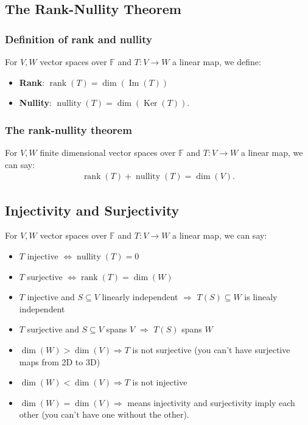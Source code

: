 \documentclass[a4paper, 12pt, twoside]{article}
\DeclareMathOperator{\Ker}{Ker}
\DeclareMathOperator{\Ima}{Im}
\DeclareMathOperator{\Rank}{rank}
\DeclareMathOperator{\Null}{nullity}
\begin{document}
\subsection{The Rank-Nullity Theorem}

\subsubsection{Definition of rank and nullity}

For $V, W$ vector spaces over $\mathbb{F}$ and $T : V \to W$ a 
linear map, we define:
\begin{itemize}
  \item \textbf{Rank}: $\Rank(T) = \dim(\Ima(T))$
  \item \textbf{Nullity}: $\Null(T) = \dim(\Ker(T))$.
\end{itemize}

\subsubsection{The rank-nullity theorem}

For $V, W$ finite dimensional vector spaces over $\mathbb{F}$ 
and $T : V \to W$ a linear map, we can say:
\begin{align*}
  \Rank(T) + \Null(T) = \dim(V).
\end{align*}

\subsection{Injectivity and Surjectivity}

For $V, W$ vector spaces over $\mathbb{F}$ and $T : V \to W$ a 
linear map, we can say:
\begin{itemize}
  \item $T$ injective $\Leftrightarrow \Null(T) = 0$
  \item $T$ surjective $\Leftrightarrow \Rank(T) = \dim(W)$
  \item $T$ injective and $S \subseteq V$ linearly independent
  $\Rightarrow$ $T(S) \subseteq W$ is linealy independent
  \item $T$ surjective and $S \subseteq V$ spans $V$ 
  $\Rightarrow$ $T(S)$ spans $W$
  \item $\dim(W) > \dim(V) \Rightarrow T$ is not surjective 
  (you can't have surjective maps from 2D to 3D)
  \item $\dim(W) < \dim(V) \Rightarrow T$ is not injective
  \item $\dim(W) = \dim(V) \Rightarrow$ means injectivity and
  surjectivity imply each other (you can't have one without
  the other).
\end{itemize}
\end{document}
